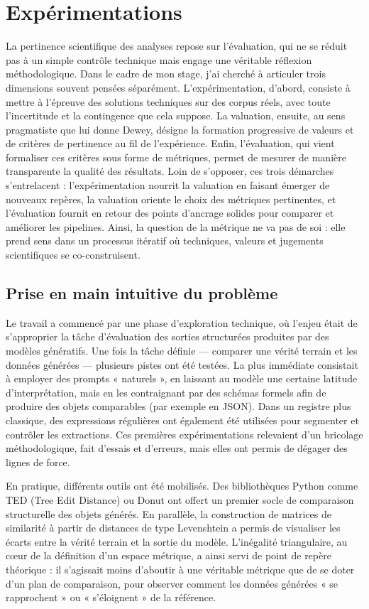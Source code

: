 \chapter{Expérimentations}

La pertinence scientifique des analyses repose sur l'évaluation, qui ne se réduit pas à un simple contrôle technique mais engage une véritable réflexion méthodologique. Dans le cadre de mon stage, j’ai cherché à articuler trois dimensions souvent pensées séparément. L’expérimentation, d’abord, consiste à mettre à l’épreuve des solutions techniques sur des corpus réels, avec toute l’incertitude et la contingence que cela suppose. La valuation, ensuite, au sens pragmatiste que lui donne Dewey, désigne la formation progressive de valeurs et de critères de pertinence au fil de l’expérience. Enfin, l’évaluation, qui vient formaliser ces critères sous forme de métriques, permet de mesurer de manière transparente la qualité des résultats. Loin de s’opposer, ces trois démarches s’entrelacent : l’expérimentation nourrit la valuation en faisant émerger de nouveaux repères, la valuation oriente le choix des métriques pertinentes, et l’évaluation fournit en retour des points d’ancrage solides pour comparer et améliorer les pipelines. Ainsi, la question de la métrique ne va pas de soi : elle prend sens dans un processus itératif où techniques, valeurs et jugements scientifiques se co-construisent.

\section{Prise en main intuitive du problème}

Le travail a commencé par une phase d’exploration technique, où l’enjeu était de s’approprier la tâche d’évaluation des sorties structurées produites par des modèles génératifs. Une fois la tâche définie — comparer une vérité terrain et les données générées — plusieurs pistes ont été testées. La plus immédiate consistait à employer des prompts « naturels », en laissant au modèle une certaine latitude d’interprétation, mais en les contraignant par des schémas formels afin de produire des objets comparables (par exemple en JSON). Dans un registre plus classique, des expressions régulières ont également été utilisées pour segmenter et contrôler les extractions. Ces premières expérimentations relevaient d’un bricolage méthodologique, fait d’essais et d’erreurs, mais elles ont permis de dégager des lignes de force.

En pratique, différents outils ont été mobilisés. Des bibliothèques Python comme TED (Tree Edit Distance) ou Donut ont offert un premier socle de comparaison structurelle des objets générés. En parallèle, la construction de matrices de similarité à partir de distances de type Levenshtein a permis de visualiser les écarts entre la vérité terrain et la sortie du modèle. L’inégalité triangulaire, au cœur de la définition d’un espace métrique, a ainsi servi de point de repère théorique : il s’agissait moins d’aboutir à une véritable métrique que de se doter d’un plan de comparaison, pour observer comment les données générées « se rapprochent » ou « s’éloignent » de la référence.

